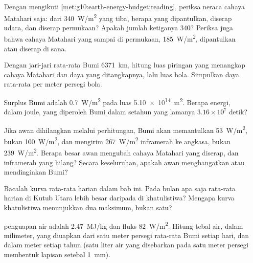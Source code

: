 \begin{exercise}[$\star\star$]\label{exo:g10:earth-energy-budget:7}
Dengan mengikuti \cref{met:g10:earth-energy-budget:reading}, periksa neraca
cahaya Matahari saja: dari \qty{340}{W/m^2} yang tiba, berapa yang
dipantulkan, diserap udara, dan diserap permukaan? Apakah jumlah ketiganya
340? Periksa juga bahwa cahaya Matahari yang sampai di permukaan,
\qty{185}{W/m^2}, dipantulkan atau diserap di sana.
\end{exercise}

\begin{exercise}[$\star\star$]\label{exo:g10:earth-energy-budget:8}
Dengan jari-jari rata-rata Bumi \qty{6371}{km}, hitung luas piringan yang
menangkap cahaya Matahari dan daya yang ditangkapnya, lalu luas bola.
Simpulkan daya rata-rata per meter persegi bola.
\end{exercise}

\begin{exercise}[$\star\star$]\label{exo:g10:earth-energy-budget:9}
Surplus Bumi adalah \qty{0.7}{W/m^2} pada luas \qty{5.10e14}{m^2}. Berapa
energi, dalam joule, yang diperoleh Bumi dalam setahun yang lamanya
$3.16\times10^7$ detik?
\end{exercise}

\begin{exercise}[$\star\star$]\label{exo:g10:earth-energy-budget:10}
Jika awan dihilangkan melalui perhitungan, Bumi akan memantulkan
\qty{53}{W/m^2}, bukan \qty{100}{W/m^2}, dan mengirim \qty{267}{W/m^2}
inframerah ke angkasa, bukan \qty{239}{W/m^2}. Berapa besar awan mengubah
cahaya Matahari yang diserap, dan inframerah yang hilang? Secara keseluruhan,
apakah awan menghangatkan atau mendinginkan Bumi?
\end{exercise}

\begin{exercise}[$\star\star$]\label{exo:g10:earth-energy-budget:11}
Bacalah kurva  rata-rata harian dalam bab ini. Pada bulan apa saja
 rata-rata harian di Kutub Utara lebih besar daripada di khatulistiwa?
Mengapa kurva khatulistiwa menunjukkan dua maksimum, bukan satu?
\end{exercise}

\begin{exercise}[$\star\star\star$]\label{exo:g10:earth-energy-budget:12}
 penguapan air adalah \qty{2.47}{MJ/kg} dan fluks 
\qty{82}{W/m^2}. Hitung tebal air, dalam milimeter, yang diuapkan dari satu
meter persegi rata-rata Bumi setiap hari, dan dalam meter setiap tahun (satu
liter air yang disebarkan pada satu meter persegi membentuk lapisan setebal
\qty{1}{mm}).
\end{exercise}

